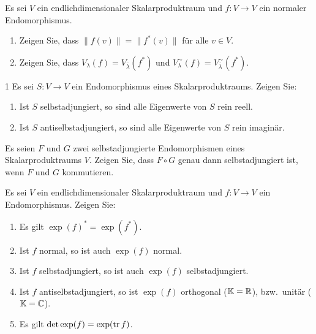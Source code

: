 \begin{question}[subtitle = Haupt- und Eigenräume normaler Endomorphismen]{1}
  Es sei $V$ ein endlichdimensionaler Skalarproduktraum und $f \colon V \to V$ ein normaler Endomorphismus.
  \begin{enumerate}[leftmargin=*]
    \item
      Zeigen Sie, dass $\|f(v)\| = \|f^*(v)\|$ für alle $v \in V$.
    \item
      Zeigen Sie, dass $V_\lambda(f) = V_{\overline{\lambda}}(f^*)$ und $V^\sim_\lambda(f) = V^\sim_{\overline{\lambda}}(f^*)$.
  \end{enumerate}
\end{question}


\begin{question}[subtitle = Eigenwerte (anti)selbstadjungierter Endomorphismen]{1}
  Es sei $S \colon V \to V$ ein Endomorphismus eines Skalarproduktraums.
  Zeigen Sie:
  \begin{enumerate}[leftmargin=*]
    \item
      Ist $S$ selbstadjungiert, so sind alle Eigenwerte von $S$ rein reell.
    \item
      Ist $S$ antiselbstadjungiert, so sind alle Eigenwerte von $S$ rein imaginär.
  \end{enumerate}
\end{question}


\begin{question}[subtitle = Komposition selbstadjungierter Endomorphismen]{1}
  Es seien $F$ und $G$ zwei selbstadjungierte Endomorphismen eines Skalarproduktraums $V$.
  Zeigen Sie, dass $F \circ G$ genau dann selbstadjungiert ist, wenn $F$ und $G$ kommutieren.
\end{question}


\begin{question}[subtitle = Rechenregeln für das Matrixexponential]{1}
  Es sei $V$ ein endlichdimensionaler Skalarproduktraum und $f \colon V \to V$ ein Endomorphismus.
  Zeigen Sie:
  \begin{enumerate}[leftmargin=*]
    \item
      Es gilt $\exp(f)^* = \exp(f^*)$.
    \item
      Ist $f$ normal, so ist auch $\exp(f)$ normal.
    \item
      Ist $f$ selbstadjungiert, so ist auch $\exp(f)$ selbstadjungiert.
    \item
      Ist $f$ antiselbstadjungiert, so ist $\exp(f)$ orthogonal ($\mathbb{K} = \mathbb{R}$), bzw.\ unitär ($\mathbb{K} = \mathbb{C}$).
    \item
      Es gilt $\det \exp(f) = \exp(\operatorname{tr} f)$.
  \end{enumerate}
\end{question}






